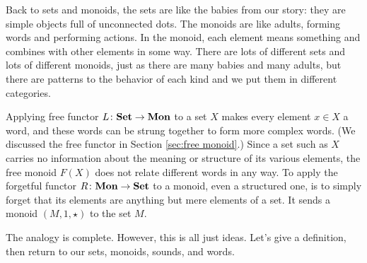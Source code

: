 \documentclass[CT4S-EN-RU]{subfiles}
\begin{document}
\begin{blockRUS}
\end{blockRUS}

\begin{blockENG}
Back to sets and monoids, the sets are like the babies from our story: they are simple objects full of unconnected dots. The monoids are like adults, forming words and performing actions. In the monoid, each element means something and combines with other elements in some way. There are lots of different sets and lots of different monoids, just as there are many babies and many adults, but there are patterns to the behavior of each kind and we put them in different categories.
\end{blockENG}

\begin{blockRUS}
\end{blockRUS}

\begin{blockENG}
Applying free functor $L\colon{\mathbf{Set}}\rightarrow{\mathbf{Mon}}$ to a set $X$ makes every element $x\in X$ a word, and these words can be strung together to form more complex words. (We discussed the free functor in Section \ref{sec:free monoid}.) Since a set such as $X$ carries no information about the meaning or structure of its various elements, the free monoid $F(X)$ does not relate different words in any way. To apply the forgetful functor $R\colon{\mathbf{Mon}}\rightarrow{\mathbf{Set}}$ to a monoid, even a structured one, is to simply forget that its elements are anything but mere elements of a set. It sends a monoid $(M,1,\star)$ to the set $M$. 
\end{blockENG}

\begin{blockRUS}
\end{blockRUS}

\begin{blockENG}
The analogy is complete. However, this is all just ideas. Let's give a definition, then return to our sets, monoids, sounds, and words.
\end{blockENG}

\begin{blockRUS}
\end{blockRUS}
\end{document}
